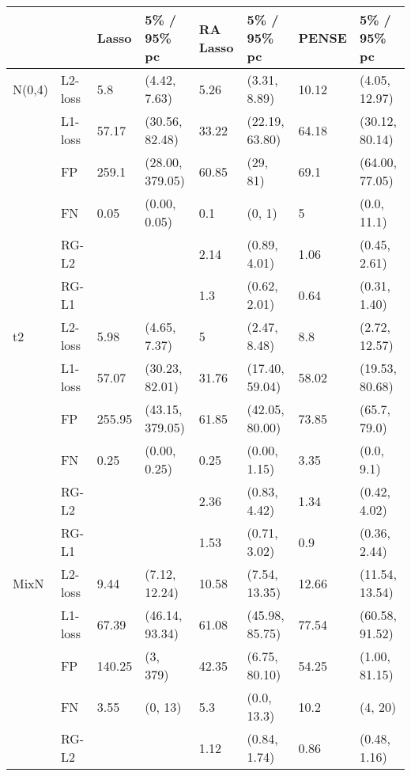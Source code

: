 \begin{table}[]
\centering
\begin{tabular}{llllllll}
       &         & Lasso  & 5\% / 95\% pc & RA Lasso & 5\% / 95\% pc & PENSE & 5\% / 95\% pc \\ \hline
N(0,4) & L2-loss & 5.8    & (4.42, 7.63)     & 5.26     & (3.31, 8.89)     & 10.12 & (4.05, 12.97)    \\
       & L1-loss & 57.17  & (30.56, 82.48)   & 33.22    & (22.19, 63.80)   & 64.18 & (30.12, 80.14)   \\
       & FP      & 259.1  & (28.00, 379.05)  & 60.85    & (29, 81)         & 69.1  & (64.00, 77.05)   \\
       & FN      & 0.05   & (0.00, 0.05)     & 0.1      & (0, 1)           & 5     & (0.0, 11.1)      \\
       & RG-L2   &        &               & 2.14     & (0.89, 4.01)     & 1.06  & (0.45, 2.61)     \\
       & RG-L1   &        &               & 1.3      & (0.62, 2.01)    & 0.64  & (0.31, 1.40)     \\ \hline
t2     & L2-loss & 5.98   & (4.65, 7.37)     & 5        & (2.47, 8.48)     & 8.8   & (2.72, 12.57)    \\
       & L1-loss & 57.07  & (30.23, 82.01)   & 31.76    & (17.40, 59.04)   & 58.02 & (19.53, 80.68)   \\
       & FP      & 255.95 & (43.15, 379.05)  & 61.85    & (42.05, 80.00)   & 73.85 & (65.7, 79.0)     \\
       & FN      & 0.25   & (0.00, 0.25)     & 0.25     & (0.00, 1.15)     & 3.35  & (0.0, 9.1)       \\
       & RG-L2   &        &               & 2.36     & (0.83, 4.42)     & 1.34  & (0.42, 4.02)     \\
       & RG-L1   &        &               & 1.53     & (0.71, 3.02)     & 0.9   & (0.36, 2.44)     \\ \hline
MixN   & L2-loss & 9.44   & (7.12, 12.24)    & 10.58    & (7.54, 13.35)    & 12.66 & (11.54, 13.54)   \\
       & L1-loss & 67.39  & (46.14, 93.34)   & 61.08    & (45.98, 85.75)   & 77.54 & (60.58, 91.52)   \\
       & FP      & 140.25 & (3, 379)         & 42.35    & (6.75, 80.10)    & 54.25 & (1.00, 81.15)    \\
       & FN      & 3.55   & (0, 13)          & 5.3      & (0.0, 13.3)      & 10.2  & (4, 20)          \\
       & RG-L2   &        &               & 1.12     & (0.84, 1.74)     & 0.86  & (0.48, 1.16)     \\

\end{tabular}
\end{table}
